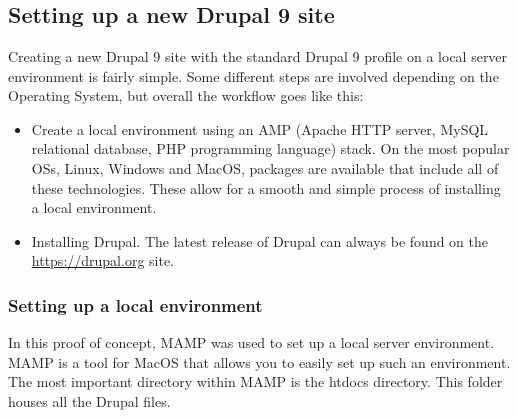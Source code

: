 
\lstset{
	basicstyle=\ttfamily,
	columns=fullflexible,
	frame=single,
	breaklines=true
}

\chapter{}
\label{ch:proofofconcept}

\section{Setting up a new Drupal 9 site}

Creating a new Drupal 9 site with the standard Drupal 9 profile on a local server environment is fairly simple. Some different steps are involved depending on the Operating System, but overall the workflow goes like this: 
\begin{itemize}
	\item Create a local environment using an AMP (Apache HTTP server, MySQL relational database, PHP programming language) stack. On the most popular OSs, Linux, Windows and MacOS, packages are available that include all of these technologies. These allow for a smooth and simple process of installing a local environment.
	\item Installing Drupal. The latest release of Drupal can always be found on the \url{https://drupal.org} site.
\end{itemize}

\subsection{Setting up a local environment}

In this proof of concept, MAMP was used to set up a local server environment. MAMP is a tool for MacOS that allows you to easily set up such an environment. The most important directory within MAMP is the htdocs directory. This folder houses all the Drupal files. 


